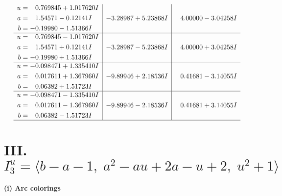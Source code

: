 \documentclass[1p]{elsarticle_modified}
\theoremstyle{definition}
\begin{document}
$$\begin{array}{c|c|c}
\begin{aligned}
u &= \phantom{-}0.769845 + 1.017620 I \\
a &= \phantom{-}1.54571 - 0.12141 I \\
b &= -0.19980 - 1.51366 I\end{aligned}
 & -3.28987 + 5.23868 I & \phantom{-}4.00000 - 3.04258 I \\ \hline\begin{aligned}
u &= \phantom{-}0.769845 - 1.017620 I \\
a &= \phantom{-}1.54571 + 0.12141 I \\
b &= -0.19980 + 1.51366 I\end{aligned}
 & -3.28987 - 5.23868 I & \phantom{-}4.00000 + 3.04258 I \\ \hline\begin{aligned}
u &= -0.098471 + 1.335410 I \\
a &= \phantom{-}0.017611 + 1.367960 I \\
b &= \phantom{-}0.06382 + 1.51723 I\end{aligned}
 & -9.89946 + 2.18536 I & \phantom{-}0.41681 - 3.14055 I \\ \hline\begin{aligned}
u &= -0.098471 - 1.335410 I \\
a &= \phantom{-}0.017611 - 1.367960 I \\
b &= \phantom{-}0.06382 - 1.51723 I\end{aligned}
 & -9.89946 - 2.18536 I & \phantom{-}0.41681 + 3.14055 I\\
 \hline 
 \end{array}$$\newpage\newpage\renewcommand{\arraystretch}{1}
\centering \section*{III. $I^u_{3}= \langle b- a-1,\;a^2- a u+2 a- u+2,\;u^2+1 \rangle$}
\flushleft \textbf{(i) Arc colorings}\\
\end{document}
